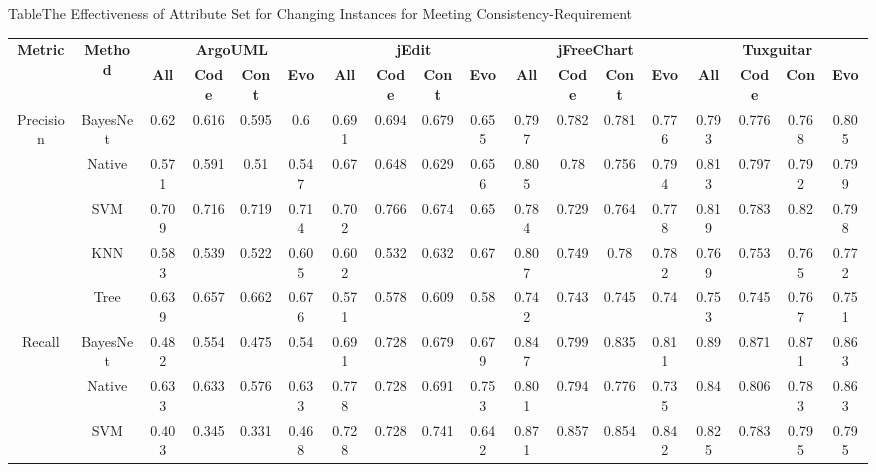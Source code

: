 {\begin{table*}[htbp]
\scriptsize
{Table$\!$}{The Effectiveness of Attribute Set for Changing Instances for Meeting Consistency-Requirement}
\vspace{0.5em}
\centering
\begin{tabular}{cccccccccccccccccc}
\toprule[1.5pt]
\multirow{2}{*}{\textbf{Metric}}&\multirow{2}{*}{\textbf{Method}}&\multicolumn{4}{c}{\textbf{ArgoUML}}&\multicolumn{4}{c}{\textbf{jEdit}}&\multicolumn{4}{c}{\textbf{jFreeChart}}&\multicolumn{4}{c}{\textbf{Tuxguitar}}\\
\cline{3-18}
&&\textbf{All}&\textbf{Code}&\textbf{Cont}&\textbf{Evo}&\textbf{All}&\textbf{Code}&\textbf{Cont}&\textbf{Evo}&\textbf{All}&\textbf{Code}&\textbf{Cont}&\textbf{Evo}&\textbf{All}&\textbf{Code}&\textbf{Con}&\textbf{Evo}~\\
\midrule[1pt]
\multirow{5}{*}{Precision}
&BayesNet&0.62	&0.616&	0.595&	0.6&		0.691&	0.694	&0.679	&0.655	&	0.797	&0.782	&0.781	&0.776		&0.793	&0.776	&0.768&	0.805\\
&Native&0.571	&0.591&	0.51&	0.547	&	0.67&	0.648	&0.629	&0.656	&	0.805	&0.78	&0.756	&0.794	&	0.813	&0.797	&0.792&	0.799\\
&SVM&	0.709	&0.716	&0.719	&0.714		&0.702	&0.766	&0.674	&0.65		&0.784	&0.729	&0.764	&0.778	&	0.819	&0.783	&0.82&	0.798\\
&KNN&	0.583	&0.539	&0.522	&0.605		&0.602	&0.532	&0.632	&0.67		&0.807	&0.749	&0.78	&0.782		&0.769	&0.753	&0.765	&0.772\\
&Tree&	0.639	&0.657	&0.662	&0.676		&0.571	&0.578	&0.609	&0.58		&0.742	&0.743	&0.745&	0.74		&0.753	&0.745	&0.767	&0.751\\
\hline
\multirow{5}{*}{Recall}
&BayesNet&0.482	&0.554	&0.475	&0.54		&0.691	&0.728	&0.679	&0.679		&0.847	&0.799	&0.835	&0.811		&0.89	&0.871	&0.871	&0.863\\
&Native&0.633	&0.633	&0.576	&0.633		&0.778	&0.728	&0.691	&0.753		&0.801	&0.794	&0.776	&0.735		&0.84	&0.806	&0.783	&0.863\\
&SVM&	0.403	&0.345	&0.331	&0.468		&0.728	&0.728	&0.741	&0.642		&0.871	&0.857	&0.854	&0.842		&0.825	&0.783	&0.795	&0.795\\

\end{tabular}
\end{table*}}
